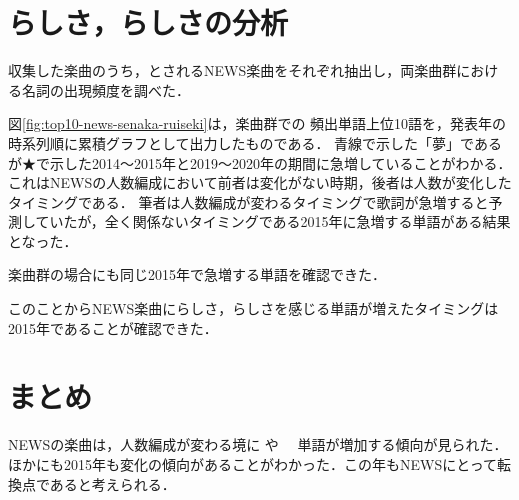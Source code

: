 \sectionmargin

\section{\senaka らしさ，\emotional らしさの分析}
\sectionmargin



	収集した楽曲のうち，\senaka \emotional とされるNEWS楽曲をそれぞれ抽出し，両楽曲群における名詞の出現頻度を調べた．



	図\ref{fig:top10-news-senaka-ruiseki}は，\senaka 楽曲群での
	頻出単語上位10語を，発表年の時系列順に累積グラフとして出力したものである．
	青線で示した「夢」であるが★で示した2014～2015年と2019～2020年の期間に急増していることがわかる．
	これはNEWSの人数編成において前者は変化がない時期，後者は人数が変化したタイミングである．
	筆者は人数編成が変わるタイミングで歌詞が急増すると予測していたが，全く関係ないタイミングである2015年に急増する単語がある結果となった．



	\emotional 楽曲群の場合にも同じ2015年で急増する単語を確認できた．

このことからNEWS楽曲に\senaka らしさ，\emotional らしさを感じる単語が増えたタイミングは2015年であることが確認できた．


	
\section{まとめ}

NEWSの楽曲は，人数編成が変わる境に\senaka
や
\emotional　単語が増加する傾向が見られた．
ほかにも2015年も変化の傾向があることがわかった．この年もNEWSにとって転換点であると考えられる．



